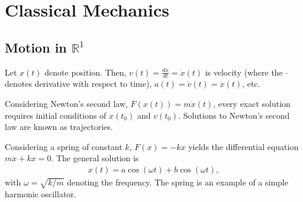 \documentclass[10pt]{extarticle}
\title{}
\author{}
\date{}
\newcommand{\R}{\mathbb{R}}
\theoremstyle{plain}
\theoremstyle{definition}
\theoremstyle{remark}
\renewcommand{\newline}{\hfill\break}
\begin{document}
  \section{Classical Mechanics}%
  \subsection{Motion in $\R^{1}$}%
  Let $x(t)$ denote position. Then, $v(t) = \frac{dx}{dt} = \dot{x}(t)$ is velocity (where the $\cdot$ denotes derivative with respect to time), $a(t) = \dot{v}(t) = \ddot{x}(t)$, etc.\newline

  Considering Newton's second law, $F(x(t)) = m\ddot{x}(t)$, every exact solution requires initial conditions of $x(t_0)$ and $v(t_0)$. Solutions to Newton's second law are known as trajectories.\newline

  Considering a spring of constant $k$, $F(x) = -kx$ yields the differential equation $m\ddot{x} + kx = 0$. The general solution is
  \begin{align*}
    x(t) = a\cos(\omega t) + b\cos(\omega t),
  \end{align*}
  with $\omega = \sqrt{k/m}$ denoting the frequency. The spring is an example of a simple harmonic oscillator.
\end{document}
